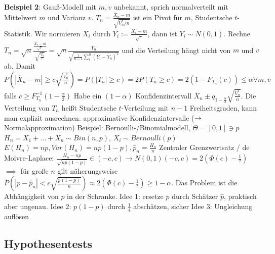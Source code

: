 \begin{outline}
        \2 \textbf{Beispiel 2}: Gauß-Modell mit $m,v$ unbekannt, sprich normalverteilt mit Mittelwert $m$ und Varianz $v$.
        \2 $T_n = \frac{\overline{X}_n-m}{\sqrt{V_n^*/n}}$ ist ein Pivot für $m$, Studentsche $t$-Statistik.
        \2 Wir normieren $X_i$ durch $Y_i:=\frac{X_i-m}{\sqrt{r}}$, dann ist $Y_i\sim N(0,1)$.
        \2 Rechne $T_n=\sqrt{n}\frac{\frac{\overline{X}_n-m}{\sqrt{r}}}{\sqrt{\frac{V_n^*}{r}}} = \sqrt{n} \frac{\overline{Y}_n}{\sqrt{\frac{1}{n-1}\sum_i^n(Y_i-\overline{Y}_n)^2}}$ und die Verteilung hängt nicht von $m$ und $v$ ab.
        \2 Damit $P(|\overline{X}_n-m|\geq c\sqrt{\frac{V_n^*}{n}})=P(|T_n|\geq c) = 2P(T_n\geq c) = 2(1-F_{T_n}(c)) \leq \alpha \forall m, v$ falls $c\geq F^{-1}_{T_n}(1-\frac{\alpha}{2})$
        \2 Habe ein $(1-\alpha)$ Konfidenzintervall $\overline{X}_n\pm q_{1-\frac{\alpha}{2}} \sqrt{\frac{V_n^*}{n}}$. Die Verteilung von $T_n$ heißt Studentsche $t$-Verteilung mit $n-1$ Freiheitsgraden, kann man explizit ausrechnen.
    \1 approximative Konfidenzintervalle ($\rightarrow$ Normalapproximation)
        \2 Beispiel: Bernoulli-/Binomialmodell, $\Theta = [0,1]\ni p$
            \3 $H_n=X_1+\ldots + X_n \sim Bin(n,p)$, $X_i\sim Bernoulli(p)$
            \3 $E(H_n)=np, Var(H_n)=np(1-p), \hat{p}_n=\frac{H_n}{n}$
            \3 Zentraler Grenzwertsatz / de Moivre-Laplace: $\frac{H_n-np}{\sqrt{np(1-p)}}\in (-c,c) \longrightarrow N(0,1)(-c,c)=2(\Phi(c)-\frac{1}{?})$
            $\implies$ für große $n$ gilt näherungsweise $P(|p-\hat{p}_n|<c\sqrt{\frac{p(1-p)}{n}}) \approx 2(\Phi(c)-\frac{1}{?}) \geq 1-\alpha$. Das Problem ist die Abhängigkeit von $p$ in der Schranke.
            \3 Idee 1: ersetze $p$ durch Schätzer $\hat{p}$, praktisch aber ungenau.
            \3 Idee 2: $p(1-p)$ durch $\frac{1}{4}$ abschätzen, sicher
            \3 Idee 3: Ungleichung auflösen
\end{outline}

\subsection{Hypothesentests}

